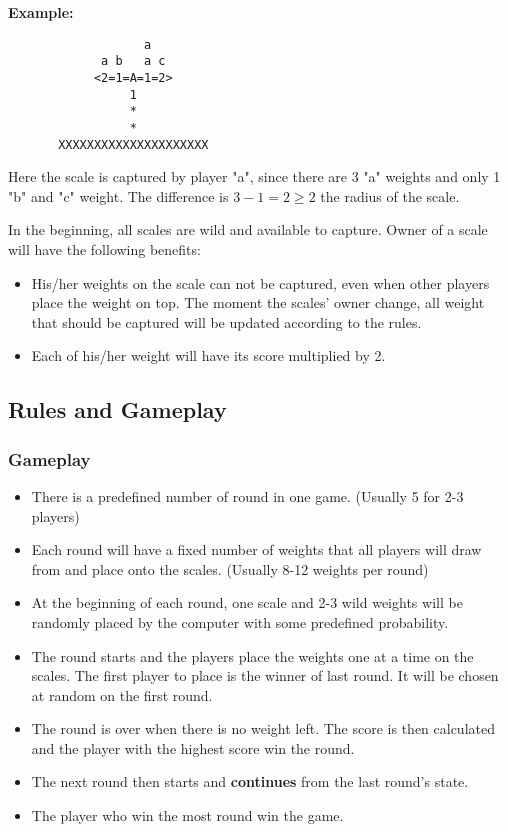 \documentclass[12pt]{article}
\begin{document}
\textbf{Example:}
\begin{verbatim}
                   a
             a b   a c
            <2=1=A=1=2>
                 1     
                 *     
                 *    
       XXXXXXXXXXXXXXXXXXXXX
\end{verbatim}

Here the scale is captured by player "a", since there are 3 "a" weights and only
1 "b" and "c" weight. The difference is $3 - 1 = 2 \geq 2$ the radius of the
scale.

In the beginning, all scales are wild and available to capture. Owner of a scale
will have the following benefits:
\begin{itemize}
  \item His/her weights on the scale can not be captured, even when other
    players place the weight on top. The moment the scales' owner change, all
    weight that should be captured will be updated according to the rules.
  \item Each of his/her weight will have its score multiplied by 2.
\end{itemize}

\subsection{Rules and Gameplay} 
\subsubsection{Gameplay}
\begin{itemize}
  \item There is a predefined number of round in one game. (Usually 5 for 2-3
    players)
  \item Each round will have a fixed number of weights that all players will
    draw from and place onto the scales. (Usually 8-12 weights per round)
  \item At the beginning of each round, one scale and 2-3 wild weights will be
    randomly placed by the computer with some predefined probability.
  \item The round starts and the players place the weights one at a time on the
    scales. The first player to place is the winner of last round.  It will be
    chosen at random on the first round.
  \item The round is over when there is no weight left. The score is then
    calculated and the player with the highest score win the round.
  \item The next round then starts and \textbf{continues} from the last round's
    state.
  \item The player who win the most round win the game.
\end{itemize}
\end{document}
